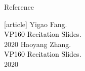 \documentclass{beamer}
\begin{document}
\begin{frame}{Reference}
  \begin{thebibliography}{9}
  [article]
   Yigao Fang.\\
  \textcolor{black}{VP160 Recitation Slides.}\\
  2020
   Haoyang Zhang.\\
  \textcolor{black}{VP160 Recitation Slides.}\\
  2020
  \end{thebibliography}
  \end{frame}
  
\end{document}
